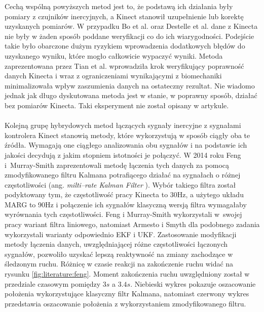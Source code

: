 	Cechą wspólną powyższych metod jest to, że podstawą ich działania były pomiary z czujników inercyjnych, a Kinect stanowił uzupełnienie lub korektę uzyskanych pomiarów. W przypadku Bo et al. oraz Destelle et al. dane z Kinecta nie były w żaden sposób poddane weryfikacji co do ich wiarygodności. Podejście takie było obarczone dużym ryzykiem wprowadzenia dodatkowych błędów do uzyskanego wyniku, które mogło całkowicie wypaczyć wyniki. Metoda zaprezentowana przez Tian et al. wprowadziła krok weryfikujący poprawność danych Kinecta i wraz z ograniczeniami wynikającymi z biomechaniki minimalizowała wpływ zaszumienia danych na ostateczny rezultat. Nie wiadomo jednak jak długo dyskutowana metoda jest w stanie, w poprawny sposób, działać bez pomiarów Kinecta. Taki eksperyment nie został opisany w artykule.\\\\
	
	Kolejną grupę hybrydowych metod łączących sygnały inercyjne z sygnałami kontrolera Kinect stanowią metody, które wykorzystują w sposób ciągły oba te źródła. Wymagają one ciągłego analizowania obu sygnałów i na podstawie ich jakości decydują z jakim stopniem istotności je połączyć. W 2014 roku Feng i~Murray-Smith \cite{Murray-Smith2014} zaprezentowali metodę łączenia tych danych za pomocą zmodyfikowanego filtru Kalmana potrafiącego działać na sygnałach o różnej częstotliwości (ang. \emph{milti--rate Kalman Filter} \cite{Dhuli2009}). Wybór takiego filtra został podyktowany tym, że częstotliwość pracy Kinecta to 30Hz, a użytego układu MARG to 90Hz i połączenie ich sygnałów klasyczną wersją filtra wymagałaby wyrównania tych częstotliwości. Feng i Murray-Smith wykorzystali w~swojej pracy wariant filtra liniowego, natomiast Armesto i Smyth dla podobnego zadania wykorzystali warianty odpowiednio EKF\cite{Armesto01062007} i UKF\cite{Smyth2007}. Zastosowanie modyfikacji metody łączenia danych, uwzględniającej różne częstotliwości łączonych sygnałów, pozwoliło uzyskać lepszą reaktywność na zmiany zachodzące w śledzonym ruchu. Różnicę w czasie reakcji na zakończenie ruchu widać na rysunku \ref{fig:literature:feng}. Moment zakończenia ruchu uwzględniony został w przedziale czasowym pomiędzy $3s$ a $3.4s$. Niebieski wykres pokazuje oszacowanie położenia wykorzystujące klasyczny filtr Kalmana, natomiast czerwony wykres przedstawia oszacowanie położenia z wykorzystaniem zmodyfikowanego filtru.
	

